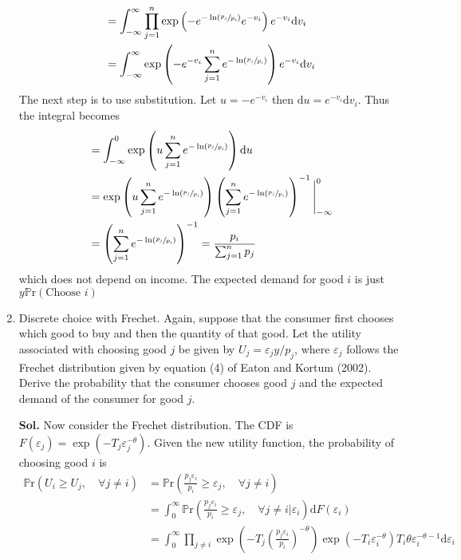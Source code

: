 \documentclass[12pt,oneside,reqno]{amsart}
\newcommand{\pr}{\mathbb{P}\mathrm{r}}
\begin{document}
\begin{enumerate}[leftmargin=*,label=\textbf{\arabic*.}]
\begin{align*}
        &= \int_{-\infty}^\infty \prod_{j=1}^n\exp\left(-e^{-\ln\left(\sfrac{p_j}{p_i}\right)}e^{-v_i}\right)e^{-v_i}\mathrm{d}v_i \\ 
        &= \int_{-\infty}^\infty \exp\left(-e^{-v_i}\sum_{j=1}^ne^{-\ln\left(\sfrac{p_j}{p_i}\right)}\right)e^{-v_i}\mathrm{d}v_i
    \end{align*}
    The next step is to use substitution. Let $u=-e^{-v_i}$ then $\mathrm{d}u = e^{-v_i}\mathrm{d}v_i$. Thus the integral becomes
    \begin{align*}
        &= \int_{-\infty}^0 \exp\left(u\sum_{j=1}^ne^{-\ln\left(\sfrac{p_j}{p_i}\right)}\right)\mathrm{d}u \\ 
        &= \exp\left(u\sum_{j=1}^ne^{-\ln\left(\sfrac{p_j}{p_i}\right)}\right)\left(\sum_{j=1}^ne^{-\ln\left(\sfrac{p_j}{p_i}\right)}\right)^{-1}\Bigg\vert_{-\infty}^0 \\ 
        &= \left(\sum_{j=1}^ne^{-\ln\left(\sfrac{p_j}{p_i}\right)}\right)^{-1} = \frac{p_i}{\sum_{j=1}^n p_j}
    \end{align*}
    which does not depend on income. The expected  demand for good $i$ is just $y\pr\left(\text{Choose }i\right)$
    \item Discrete choice with Frechet. Again, suppose that the consumer first chooses which good to buy and then the quantity of that good. Let the utility associated with choosing good $j$ be given by $U_j=\varepsilon_j y / p_j$, where $\varepsilon_j$ follows the Frechet distribution given by equation (4) of Eaton and Kortum (2002). Derive the probability that the consumer chooses good $j$ and the expected demand of the consumer for good $j$.
    \item[\textbf{Sol.}] Now consider the Frechet distribution. The CDF is $F(\varepsilon_j) = \exp\left(-T_j\varepsilon_j^{-\theta}\right)$. Given the new utility function, the probability of choosing good $i$ is 
    \begin{align*}
        \pr\left(U_i\geq U_j,\quad \forall j\neq i \right) &= \pr\left(\frac{p_j\varepsilon_i}{p_i}\geq \varepsilon_j,\quad\forall j\neq i \right) \\ 
        &=  \int_{0}^{\infty}\pr\left(\frac{p_j\varepsilon_i}{p_i}\geq \varepsilon_j,\quad\forall j\neq i\bigg\vert \varepsilon_i\right) \mathrm{d}F(\varepsilon_i)\\ 
        &= \int_{0}^{\infty}\prod_{j\neq i} \exp\left(-T_j\left(\frac{p_j\varepsilon_i}{p_i}\right)^{-\theta}\right) \exp\left(-T_i\varepsilon_i^{-\theta}\right)T_i\theta\varepsilon_i^{-\theta-1}\mathrm{d}\varepsilon_i \\ 

\end{align*}
\end{enumerate}
\end{document}
